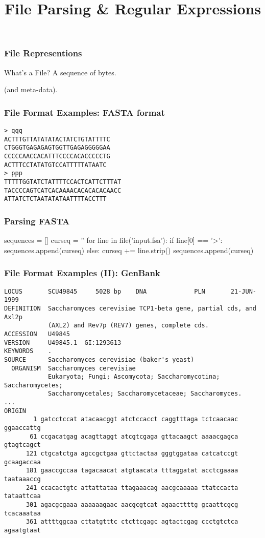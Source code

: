 
\title{File Parsing \& Regular Expressions}

\frame{\maketitle}

\begin{frame}[fragile]
\frametitle{File Representions}
\begin{block}{What's a File?}
A sequence of bytes.

\bigskip
(and meta-data).
\end{block}
\end{frame}

\begin{frame}[fragile]
\frametitle{File Format Examples: FASTA format}
\begin{verbatim}
> qqq
ACTTTGTTATATATACTATCTGTATTTTC
CTGGGTGAGAGAGTGGTTGAGAGGGGGAA
CCCCCAACCACATTTCCCCACACCCCCTG
ACTTTCCTATATGTCCATTTTTATAATC
> ppp
TTTTTGGTATCTATTTTCCACTCATTCTTTAT
TACCCCAGTCATCACAAAACACACACACAACC
ATTATCTCTAATATATAATTTTACCTTT
\end{verbatim}
\end{frame}

\begin{frame}[fragile]
\frametitle{Parsing FASTA}

\begin{python}
sequences = []
curseq = ''
for line in file('input.fsa'):
    if line[0] == '>':
        sequences.append(curseq)
    else:
        curseq += line.strip()
sequences.append(curseq)
\end{python}
\end{frame}

\begin{frame}[fragile]
\frametitle{File Format Examples (II): GenBank}

\begin{verbatim}
LOCUS       SCU49845     5028 bp    DNA             PLN       21-JUN-1999
DEFINITION  Saccharomyces cerevisiae TCP1-beta gene, partial cds, and Axl2p
            (AXL2) and Rev7p (REV7) genes, complete cds.
ACCESSION   U49845
VERSION     U49845.1  GI:1293613
KEYWORDS    .
SOURCE      Saccharomyces cerevisiae (baker's yeast)
  ORGANISM  Saccharomyces cerevisiae
            Eukaryota; Fungi; Ascomycota; Saccharomycotina; Saccharomycetes;
            Saccharomycetales; Saccharomycetaceae; Saccharomyces.
...
ORIGIN
        1 gatcctccat atacaacggt atctccacct caggtttaga tctcaacaac ggaaccattg
       61 ccgacatgag acagttaggt atcgtcgaga gttacaagct aaaacgagca gtagtcagct
      121 ctgcatctga agccgctgaa gttctactaa gggtggataa catcatccgt gcaagaccaa
      181 gaaccgccaa tagacaacat atgtaacata tttaggatat acctcgaaaa taataaaccg
      241 ccacactgtc attattataa ttagaaacag aacgcaaaaa ttatccacta tataattcaa
      301 agacgcgaaa aaaaaagaac aacgcgtcat agaacttttg gcaattcgcg tcacaaataa
      361 attttggcaa cttatgtttc ctcttcgagc agtactcgag ccctgtctca agaatgtaat
\end{verbatim}
\end{frame}

